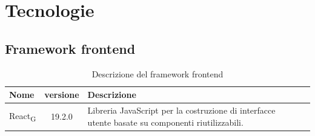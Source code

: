 \documentclass[11pt,a4paper]{article}
\newcommand{\gls}[1]{#1\textsubscript{G}}
\begin{document}
\newpage

\section{Tecnologie}
\subsection{Framework frontend}
\begin{table}[H]
    \centering
    \begin{tabular}{|l|c|>{\raggedright\arraybackslash}p{}|p{}|}
        \hline
        \textbf{Nome} & \textbf{versione} & \textbf{Descrizione} \\
        \hline
        \gls{React} & 19.2.0 & Libreria JavaScript per la costruzione di interfacce utente basate su componenti riutilizzabili. \\
        \hline
    \end{tabular}
    \caption{Descrizione del framework frontend}
    \label{tab:framework_frontend}
\end{table}
\end{document}
